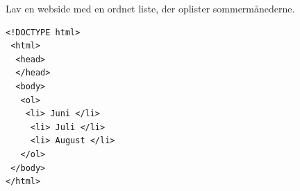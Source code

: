 Lav en webside med en ordnet liste, der oplister sommermånederne. 
\begin{answerspot}
  \makeTextField[10cm]
\end{answerspot}
\begin{loesung}
  \begin{lstlisting}
<!DOCTYPE html>
 <html>
  <head>
  </head>
  <body>
   <ol>
    <li> Juni </li>
     <li> Juli </li>
     <li> August </li>
   </ol>
 </body>
</html>

  \end{lstlisting}
\end{loesung}







